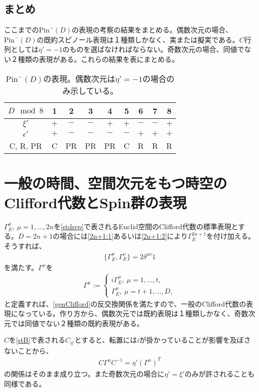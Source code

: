 \documentclass[12pt,a4paper,dvipdfmx]{jlreq}
\newcommand{\Pim}{\mathrm{Pin}^{-}}
\begin{document}
\subsection{まとめ}
ここまでの$\Pim(D)$の表現の考察の結果をまとめる。偶数次元の場合、$\Pim(D)$の既約スピノール表現は１種類しかなく、実または擬実である。$C$行列としては$\eta'=-1$のものを選ばなければならない。奇数次元の場合、同値でない２種類の表現がある。これらの結果を表にまとめる。
\begin{table}[htb]
  \begin{center}
    \begin{tabular}{|c|c|c|c|c|c|c|c|c|}\hline
      $D \mod 8$ & 1 & 2 & 3 & 4 & 5 & 6 & 7 & 8\\ \hline
      $\xi'$ & $+$ & $-$ & $-$ & $+$ & $+$ & $-$ & $-$ & $+$ \\\hline
      $\epsilon'$ & $+$ & $-$ & $-$ & $-$ & $-$ & $+$ & $+$ & $+$ \\ \hline
      C, R, PR & C & PR & PR & PR & C & R & R & R \\ \hline
    \end{tabular}
  \end{center} 
  \caption{$\Pim(D)$の表現。偶数次元は$\eta'=-1$の場合のみ示している。}
  \end{table}
    
\section{一般の時間、空間次元をもつ時空のClifford代数とSpin群の表現}
$\Gamma_{E}^{\mu},\ \mu=1,\dots,2n$を\eqref{stdrep}で表されるEuclid空間のClifford代数の標準表現とする。$D=2n+1$の場合には\eqref{2n+1:1}あるいは\eqref{2n+1:2}により$\Gamma_{E}^{2n+1}$を付け加える。そうすれば、
\begin{align*}
  \{\Gamma_{E}^{\mu},\Gamma_{E}^{\nu}\}=2\delta^{\mu\nu}1
\end{align*}
を満たす。$\Gamma^{\mu}$を
\begin{align}
  \Gamma^{\mu}:=
  \begin{cases}
    i\Gamma^{\mu}_{E},\ \mu=1,\dots,t,\\
    \Gamma^{\mu}_{E},\ \mu=t+1,\dots,D,
  \end{cases}
\end{align}
と定義すれば、\eqref{genClifford}の反交換関係を満たすので、一般のClifford代数の表現になっている。作り方から、偶数次元では既約表現は１種類しかなく、奇数次元では同値でない２種類の既約表現がある。

$C$を\eqref{stB}で表される$C_{\eta'}$とすると、転置には$i$が掛かっていることが影響を及ぼさないことから、
\begin{align*}
  C\Gamma^{\mu}C^{-1}=\eta'(\Gamma^{\mu})^T
\end{align*}
の関係はそのまま成り立つ。また奇数次元の場合に$\eta'=\xi'$のみが許されることも同様である。
\end{document}
